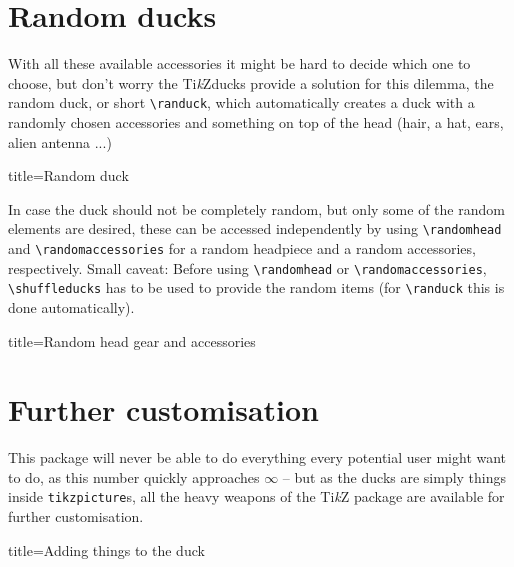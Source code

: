 \documentclass[parskip=half]{scrartcl}
\newcommand{\TikZ}{Ti\emph{k}Z\xspace}
\newcommand{\tikzducks}{Ti\emph{k}Zducks\xspace}
\begin{document}
\clearpage
\section{Random ducks}
With all these available accessories it might be hard to decide which one to choose, but don't worry the \tikzducks provide a solution for this dilemma, the random duck, or short \lstinline|\randuck|, which automatically creates a duck with a randomly chosen accessories and something on top of the head (hair, a hat, ears, alien antenna ...)

\begin{tcblisting}{title={Random duck}}
\begin{tikzpicture}
	\randuck
\end{tikzpicture}
\end{tcblisting}

In case the duck should not be completely random, but only some of the random elements are desired, these can be accessed independently by using \lstinline|\randomhead| and \lstinline|\randomaccessories| for a random headpiece and a random accessories, respectively. Small caveat: Before using \lstinline|\randomhead| or \lstinline|\randomaccessories|, \lstinline|\shuffleducks| has to be used to provide the random items (for \lstinline|\randuck| this is done automatically).     

\begin{tcblisting}{title={Random head gear and accessories}}
\begin{tikzpicture}
	\shuffleducks
	\duck[\randomhead, \randomaccessories]
\end{tikzpicture}
\end{tcblisting}

\section{Further customisation}

This package will never be able to do everything every potential user might want to do, as this number quickly approaches $\infty$ -- but as the ducks are simply things inside \lstinline|tikzpicture|s, all the heavy weapons of the \TikZ package are available for further customisation.

\begin{tcblisting}{title={Adding things to the duck}}
\end{tcblisting}
\end{document}
